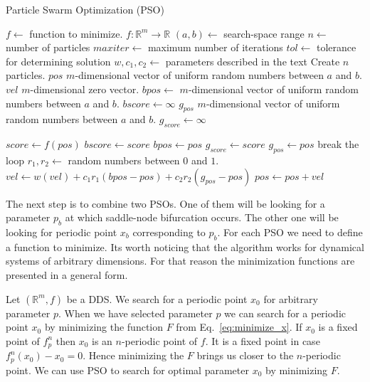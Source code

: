 \begin{algorithm}[!h]
    \caption{Particle Swarm Optimization (PSO)}
    \label{alg:pso}
    \begin{algorithmic}[1]
        \Statex $f \gets$ function to minimize. $f: \mathbb{R}^{m} \rightarrow \mathbb{R}$  
        \Statex $(a, b) \gets$ search-space range
        \Statex $n \gets$ number of particles
        \Statex $maxiter \gets$ maximum number of iterations
        \Statex $tol \gets$ tolerance for determining solution
        \Statex $w, c_{1}, c_{2} \gets$ parameters described in the text
        \State Create $n$ particles.
            \State $pos$ $m$-dimensional vector of uniform random numbers between $a$ and $b$.
            \State $vel$ $m$-dimensional zero vector.
            \State $bpos \gets$ $m$-dimensional vector of uniform random numbers between $a$ and $b$.
            \State $bscore \gets \infty$
        \EndFor
        \State $g_{pos}$ $m$-dimensional vector of uniform random numbers between $a$ and $b$.
        \State $g_{score} \gets \infty$

                \State $score \gets f(pos)$ 
                    \State $bscore \gets score$
                    \State $bpos \gets pos$
                \EndIf
                    \State $g_{score} \gets score$
                    \State $g_{pos} \gets pos$
                \EndIf
            \EndFor
                \State break the loop
            \EndIf
                \State $r_{1}, r_{2} \gets$ random numbers between $0$ and $1$.
                \State $vel \gets w(vel) + c_{1}r_{1}(bpos-pos) + c_{2}r_{2}(g_{pos}-pos)$
                \State $pos \gets pos + vel$
            \EndFor
        \EndFor
    \end{algorithmic}
\end{algorithm}

\par
The next step is to combine two PSOs.
One of them will be looking for a parameter $p_b$ at which saddle-node bifurcation occurs.
The other one will be looking for periodic point $x_b$ corresponding to $p_b$.
For each PSO we need to define a function to minimize.
Its worth noticing that the algorithm works for dynamical systems of arbitrary dimensions.
For that reason the minimization functions are presented in a general form.
\par
Let $(\mathbb{R}^{m}, f)$ be a DDS.
We search for a periodic point $x_0$ for arbitrary parameter $p$.
When we have selected parameter $p$ we can search for a periodic point $x_0$ by minimizing the function $F$ from Eq.~\ref{eq:minimize_x}.
If $x_0$ is a fixed point of $f^{n}_{p}$ then $x_0$ is an $n$-periodic point of $f$.
It is a fixed point in case $f^{n}_{p}(x_0)-x_0 = 0$.
Hence minimizing the $F$ brings us closer to the $n$-periodic point.
We can use PSO to search for optimal parameter $x_0$ by minimizing $F$.

